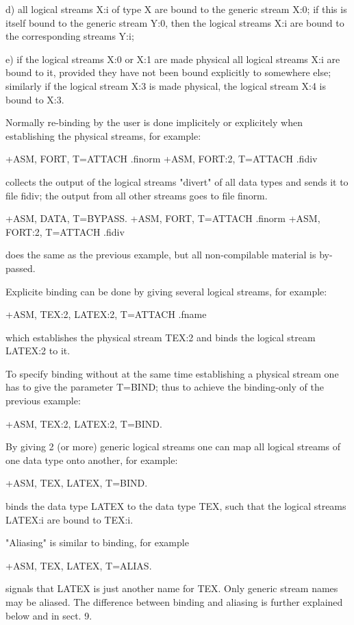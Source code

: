    d) all logical streams X:i of type X are bound to the generic stream X:0;
      if this is itself bound to the generic stream Y:0, then the logical
      streams X:i are bound to the corresponding streams Y:i;

   e) if the logical streams X:0 or X:1 are made physical all logical
      streams X:i are bound to it, provided they have not been bound
      explicitly to somewhere else; similarly if the logical stream X:3
      is made physical, the logical stream X:4 is bound to X:3.

Normally re-binding by the user is done implicitely or explicitely when
establishing the physical streams, for example:

      +ASM, FORT,   T=ATTACH  .finorm
      +ASM, FORT:2, T=ATTACH  .fidiv

collects the output of the logical streams "divert" of all data types
and sends it to file fidiv; the output from all other streams goes
to file finorm.

      +ASM, DATA,   T=BYPASS.
      +ASM, FORT,   T=ATTACH  .finorm
      +ASM, FORT:2, T=ATTACH  .fidiv

does the same as the previous example, but all non-compilable material
is by-passed.

Explicite binding can be done by giving several logical streams,
for example:

      +ASM, TEX:2, LATEX:2, T=ATTACH  .fname

which establishes the physical stream TEX:2 and binds the logical
stream LATEX:2 to it.

To specify binding without at the same time establishing a physical stream
one has to give the parameter T=BIND; thus to achieve the binding-only
of the previous example:

      +ASM, TEX:2, LATEX:2, T=BIND.

By giving 2 (or more) generic logical streams one can map all logical
streams of one data type onto another, for example:

      +ASM, TEX, LATEX, T=BIND.

binds the data type LATEX to the data type TEX, such that the logical
streams LATEX:i are bound to TEX:i.

"Aliasing" is similar to binding, for example

      +ASM, TEX, LATEX, T=ALIAS.

signals that LATEX is just another name for TEX. Only generic stream
names may be aliased. The difference between binding and aliasing is
further explained below and in sect. 9.


